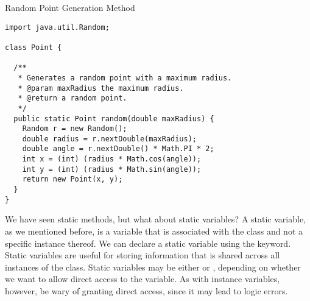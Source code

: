 \begin{cl}{Random Point Generation Method}
\begin{lstlisting}[language=MyJava]
import java.util.Random;

class Point {

  /**
   * Generates a random point with a maximum radius.
   * @param maxRadius the maximum radius.
   * @return a random point.
   */
  public static Point random(double maxRadius) {
    Random r = new Random();
    double radius = r.nextDouble(maxRadius);
    double angle = r.nextDouble() * Math.PI * 2;
    int x = (int) (radius * Math.cos(angle));
    int y = (int) (radius * Math.sin(angle));
    return new Point(x, y);
  }
}
\end{lstlisting}
\end{cl}

We have seen static methods, but what about static variables? A static variable, as we mentioned before, is a variable that is associated with the class and not a specific instance thereof. We can declare a static variable using the  keyword. Static variables are useful for storing information that is shared across all instances of the class. Static variables may be either  or , depending on whether we want to allow direct access to the variable. As with instance variables, however, be wary of granting direct access, since it may lead to logic errors.


